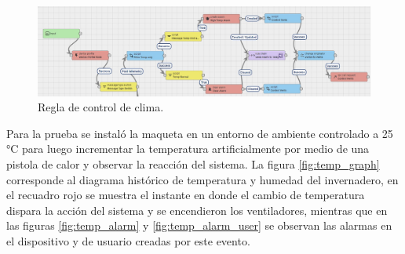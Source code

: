 \begin{figure}[h]
	\centering
	\includegraphics[width=1\textwidth]{./Figures/chapter4/temp_rule.jpg}
	\caption[Regla de control de clima]{Regla de control de clima.}
	\label{fig:temp_rule}
\end{figure}

Para la prueba se instaló la maqueta en un entorno de ambiente controlado a 25 °C para luego incrementar la temperatura artificialmente por medio de una pistola de calor y observar la reacción del sistema. La figura \ref{fig:temp_graph} corresponde al diagrama histórico de temperatura y humedad del invernadero, en el recuadro rojo se muestra el instante en donde el cambio de temperatura dispara la acción del sistema y se encendieron los ventiladores, mientras que en las figuras \ref{fig:temp_alarm} y \ref{fig:temp_alarm_user} se observan las alarmas en el dispositivo y de usuario creadas por este evento.  









